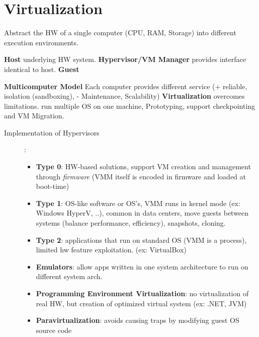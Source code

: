 \section*{Virtualization}
Abstract the HW of a single computer (CPU, RAM, Storage) into different execution environments. \\
\begin{description}[labelsep=0pt]
    \item[] \textbf{Host} underlying HW system. \textbf{Hypervisor/VM Manager} provides interface identical to host. \textbf{Guest}
    \item[History] \hspace{2pt} \textbf{Multicomputer Model} Each computer provides different service (+ reliable, isolation (sandboxing), - Maintenance, Scalability) \textbf{Virtualization} overcomes limitations. run multiple OS on one machine, Prototyping, support checkpointing and VM Migration. %
\end{description}
\begin{description}
    \item[Implementation of Hypervisors]:
        \begin{itemize}[label={}, labelsep=0pt]
        \item \textbf{Type 0}: HW-based solutions, support VM creation and management through \textit{firmware} (VMM itself is encoded in firmware and loaded at boot-time) %
        \item \textbf{Type 1}: OS-like software or OS's, VMM runs in kernel mode (ex: Windows HyperV, ..), common in data centers, move guests between systems (balance performance, efficiency), snapshots, cloning.
        \item \textbf{Type 2}: applications that run on standard OS (VMM is a process), limited hw feature exploitation. (ex: VirtualBox) %
        \item \textbf{Emulators}: allow apps written in one system architecture to run on different system arch.
        \item \textbf{Programming Environment Virtualization}: no virtualization of real HW, but creation of optimized virtual system (ex: .NET, JVM)
        \item \textbf{Paravirtualization}: avoids causing traps by modifying guest OS source code
    \end{itemize}
\end{description}
